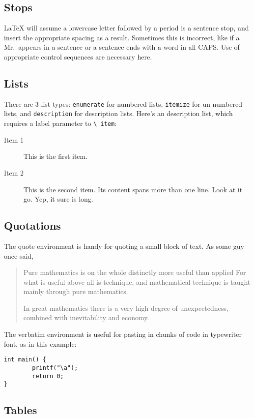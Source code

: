 \documentclass[a4paper,12pt]{article}
\begin{document}
\subsection{Stops}

\LaTeX{} will assume a lowercase letter followed by a period is a
sentence stop, and insert the appropriate spacing as a result.  Sometimes this
is incorrect, like if a Mr.\ appears in a sentence or a sentence ends with a
word in all CAPS\@.  Use of appropriate control sequences are necessary here.

\subsection{Lists}

There are 3 list types: \texttt{enumerate} for numbered lists, \texttt{itemize}
for un-numbered lists, and \texttt{description} for description lists.  Here's
an description list, which requires a label parameter to \texttt{\textbackslash
  item}:
\begin{description}
\item[Item 1] This is the first item.
\item[Item 2] This is the second item.  Its content spans more than one line.  Look at
  it go.  Yep, it sure is long.
\end{description}

\subsection{Quotations}

The quote environment is handy for quoting a small block of text. As some guy
once said,
\begin{quote}
  Pure mathematics is on the whole distinctly more useful than applied For what
  is useful above all is technique, and mathematical technique is taught mainly
  through pure mathematics.  

  In great mathematics there is a very high degree of unexpectedness, combined
  with inevitability and economy.
\end{quote}

The verbatim environment is useful for pasting in chunks of code in typewriter
font, as in this example:
\begin{verbatim}
int main() {
        printf("\a");
        return 0;
}
\end{verbatim}

\subsection{Tables}
\end{document}
